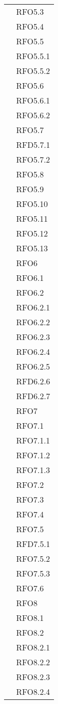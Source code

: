 \begin{longtable}{ p{12cm} | p{4cm} }
			& RFO5.3 \\
			& RFO5.4 \\
			& RFO5.5 \\
			& RFO5.5.1 \\
			& RFO5.5.2 \\
			& RFO5.6 \\
			& RFO5.6.1 \\
			& RFO5.6.2 \\
			& RFO5.7 \\
			& RFD5.7.1 \\
			& RFO5.7.2 \\
			& RFO5.8 \\
			& RFO5.9 \\
			& RFO5.10 \\
			& RFO5.11 \\
			& RFO5.12 \\
			& RFO5.13 \\
			& RFO6 \\
			& RFO6.1 \\
			& RFO6.2 \\
			& RFO6.2.1 \\
			& RFO6.2.2 \\
			& RFO6.2.3 \\
			& RFO6.2.4 \\
			& RFO6.2.5 \\
			& RFD6.2.6 \\
			& RFD6.2.7 \\
			& RFO7 \\
			& RFO7.1 \\
			& RFO7.1.1 \\
			& RFO7.1.2 \\
			& RFO7.1.3 \\
			& RFO7.2 \\
			& RFO7.3 \\
			& RFO7.4 \\
			& RFO7.5 \\
			& RFD7.5.1 \\
			& RFO7.5.2 \\
			& RFO7.5.3 \\
			& RFO7.6 \\
			& RFO8 \\
			& RFO8.1 \\
			& RFO8.2 \\
			& RFO8.2.1 \\
			& RFO8.2.2 \\
			& RFO8.2.3 \\
			& RFO8.2.4 \\

\end{longtable}
